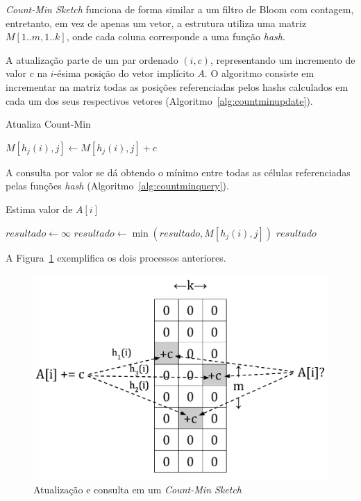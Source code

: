 \emph{Count-Min Sketch} funciona de forma similar a um filtro de Bloom com contagem, entretanto, em vez de apenas um vetor, a estrutura utiliza uma matriz $M[1..m, 1..k]$, onde cada coluna corresponde a uma função \emph{hash}.

A atualização parte de um par ordenado $(i, c)$, representando um incremento de valor $c$ na $i$-ésima posição do vetor implícito $A$. O algoritmo consiste em incrementar na matriz todas as posições referenciadas pelos hashs calculados em cada um dos seus respectivos vetores (Algoritmo~\ref{alg:countminupdate}). 

\begin{algorithm}
\linespread{1}\selectfont
\caption{Atualiza Count-Min}
\label{alg:countminupdate}
\begin{algorithmic}[1]
        \State $M[h_j(i), j] \gets M[h_j(i), j] + c$
	\EndFor
\EndProcedure
\end{algorithmic}
\end{algorithm}

A consulta por valor se dá obtendo o mínimo entre todas as células referenciadas pelas funções \emph{hash}  (Algoritmo~\ref{alg:countminquery}).

\begin{algorithm}
\linespread{1}\selectfont
\caption{Estima valor de $A[i]$}
\label{alg:countminquery}
\begin{algorithmic}[1]
    \State $resultado \gets \infty$ 
        \State $resultado \gets \min(resultado, M[h_j(i), j])$
	\EndFor
	\Return $resultado$
\EndFunction
\end{algorithmic}
\end{algorithm}

A Figura~\ref{fig:countmin1} exemplifica os dois processos anteriores.

\begin{figure}[!htbp]
  \centering
  \includegraphics[scale=0.45]{files/countmin1.pdf}
  \caption{Atualização e consulta em um \emph{Count-Min Sketch}}
  \label{fig:countmin1}
\end{figure}

